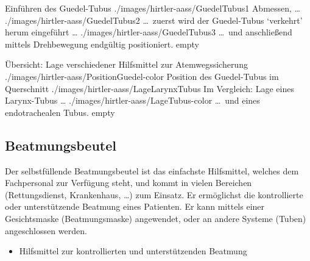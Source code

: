 


\begin{PictureSeriesWide}{}{Einführen des Guedel-Tubus
\label{fig:guedel-einfuehren}}
{./images/hirtler-aass/GuedelTubus1}
{Abmessen, \ldots}
{./images/hirtler-aass/GuedelTubus2}
{\ldots\ zuerst wird der Guedel-Tubus \enquote*{verkehrt}
herum eingeführt \ldots}
{./images/hirtler-aass/GuedelTubus3}
{\ldots\ und anschließend mittels Drehbewegung endgültig
positioniert.}
{empty}
{}
\end{PictureSeriesWide}

\begin{PictureSeriesWide}{}{Übersicht: Lage verschiedener
Hilfsmittel zur Atemwegssicherung
\label{fig:uebersicht-lage-atemwegshilfen}}
{./images/hirtler-aass/PositionGuedel-color}
{Position des Guedel-Tubus im Querschnitt}
{./images/hirtler-aass/LageLarynxTubus}
{Im Vergleich: Lage eines Larynx-Tubus \ldots} 
{./images/hirtler-aass/LageTubus-color}
{\ldots\ und eines endotrachealen Tubus.}
{empty}
{}
\end{PictureSeriesWide}

{\TakeNotesBoxLarge}

\subsection{Beatmungsbeutel}
\label{topic:beatmungsbeutel}



{Der selbstfüllende Beatmungsbeutel ist das einfachste
Hilfsmittel, welches dem Fachpersonal zur Verfügung steht, und kommt in
vielen Bereichen (Rettungsdienst, Krankenhaus, \ldots) zum
Einsatz. Er ermöglichst die kontrollierte oder
unterstützende Beatmung eines Patienten. Er kann mittels
einer Gesichtsmaske (Beatmungsmaske) angewendet, oder an
andere Systeme (Tuben) angeschlossen werden. }
{%
\begin{itemize}
  \item Hilfsmittel zur kontrollierten und unterstützenden Beatmung
\end{itemize}
}
{}
{}
{}

